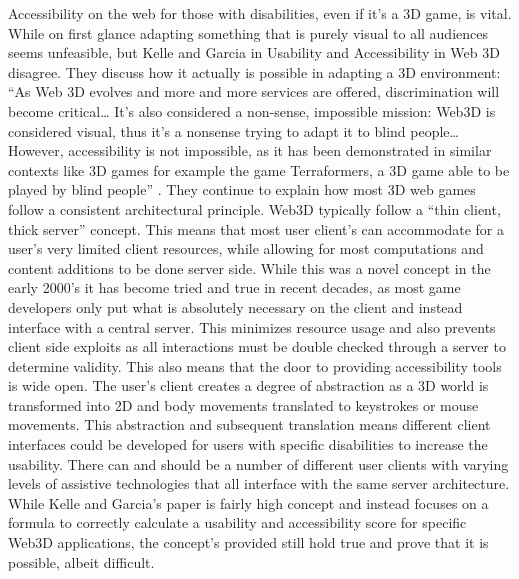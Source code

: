 \documentclass[10pt,twocolumn]{article}
\begin{document}
Accessibility on the web for those with disabilities, even if it’s a 3D game, is vital. While on first glance adapting something that is purely visual to all audiences seems unfeasible, but Kelle and Garcia in Usability and Accessibility in Web 3D disagree. They discuss how it actually is possible in adapting a 3D environment: “As Web 3D evolves and more and more services are offered, discrimination will become critical… It’s also considered a non-sense, impossible mission: Web3D is considered visual, thus it’s a nonsense trying to adapt it to blind people… However, accessibility is not impossible, as it has been demonstrated in similar contexts like 3D games for example the game Terraformers, a 3D game able to be played by blind people” \cite{Accessibilityin3D}. They continue to explain how most 3D web games follow a consistent architectural principle. Web3D typically follow a “thin client, thick server” concept. This means that most user client’s can accommodate for a user’s very limited client resources, while allowing for most computations and content additions to be done server side. While this was a novel concept in the early 2000’s it has become tried and true in recent decades, as most game developers only put what is absolutely necessary on the client and instead interface with a central server. This minimizes resource usage and also prevents client side exploits as all interactions must be double checked through a server to determine validity. This also means that the door to providing accessibility tools is wide open. The user’s client creates a degree of abstraction as a 3D world is transformed into 2D and body movements translated to keystrokes or mouse movements. This abstraction and subsequent translation means different client interfaces could be developed for users with specific disabilities to increase the usability. There can and should be a number of different user clients with varying levels of assistive technologies that all interface with the same server architecture. 
While Kelle and Garcia’s paper is fairly high concept and instead focuses on a formula to correctly calculate a usability and accessibility score for specific Web3D applications, the concept’s provided still hold true and prove that it is possible, albeit difficult.
\end{document}
